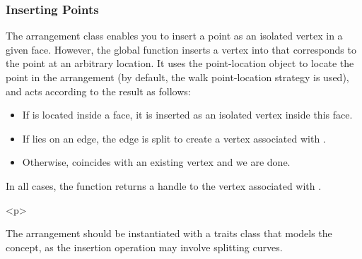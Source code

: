 \subsubsection{Inserting Points}
\label{arr_sssec:insert_point}
%
The arrangement class enables you to insert a point as an isolated
vertex in a given face. However, the global function
 inserts a vertex into  that
corresponds to the point  at an arbitrary location. It uses
the point-location object  to locate the point in the
arrangement (by default, the walk point-location strategy is used),
and acts according to the result as follows:
\begin{itemize}
\item If  is located inside a face, it is inserted as an
isolated vertex inside this face.
\item If  lies on an edge, the edge is split to create a
vertex associated with .
\item Otherwise,  coincides with an existing vertex and
we are done.
\end{itemize}
In all cases, the function returns a handle to the vertex
associated with .

\begin{ccHtmlOnly}<p>\end{ccHtmlOnly}
The arrangement  should be instantiated with a traits class
that models the  concept, as the
insertion operation may involve splitting curves.

